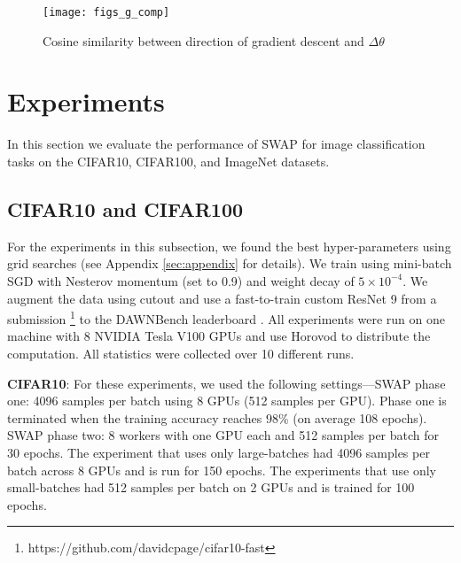 \documentclass{article} %
\begin{document}


\begin{figure}[t] 
\vspace{-0.1in}
\centering 
	\texttt{[image: figs\_g\_comp]} 
	\vspace{-0.1in}
	\caption{\small Cosine similarity between direction of gradient descent and $\Delta \theta$ } 
	\label{fig:grad_comp}
	\vspace{-0.2in}
\end{figure}

\vspace{-0.1in}
\section{Experiments} \label{sec:experiments}
\vspace{-0.1in}
In this section we evaluate the performance of SWAP for image classification tasks on the
CIFAR10, CIFAR100, and ImageNet datasets. 

\subsection{CIFAR10 and CIFAR100}
\label{sec:cifar_exp} 
\vspace{-0.1in}
For the experiments in this subsection, we found the best
hyper-parameters using grid searches (see Appendix \ref{sec:appendix} for details). We train using mini-batch SGD with Nesterov
momentum (set to 0.9) and weight decay of $5\times10^{-4}$. We augment the data using cutout
\citep{cutout} and use a fast-to-train custom ResNet 9 from a
submission \footnote{https://github.com/davidcpage/cifar10-fast} to the
DAWNBench leaderboard \citep{dawn}. All experiments were run on one machine
with 8 NVIDIA Tesla V100 GPUs and use Horovod \citep{hvd} to distribute the
computation. All statistics were collected over 10 different runs.


\textbf{CIFAR10}: For these experiments, we used the following settings---SWAP
phase one: 4096 samples per batch using 8 GPUs (512 samples per GPU).  Phase
one is terminated when the training accuracy reaches $98\%$ (on average 108
epochs).  SWAP phase two: 8 workers with one GPU each and 512 samples per batch
for 30 epochs.  The experiment that uses only large-batches had
4096 samples per batch across 8 GPUs and is run for 150 epochs. The experiments
that use only small-batches had 512 samples per batch on 2 GPUs and is trained
for 100 epochs.
\end{document}
